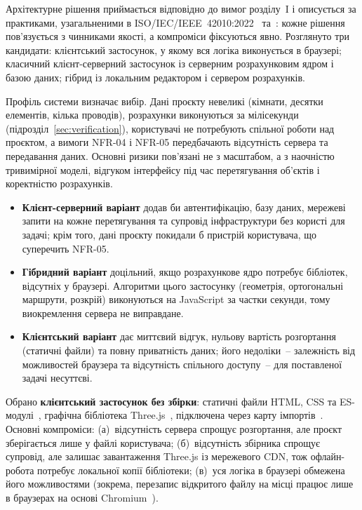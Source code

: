 

Архітектурне рішення приймається відповідно до вимог розділу~I і описується за практиками, узагальненими в ISO/IEC/IEEE~42010:2022~ та~: кожне рішення пов'язується з чинниками якості, а компроміси фіксуються явно. Розглянуто три кандидати: клієнтський застосунок, у якому вся логіка виконується в браузері; класичний клієнт-серверний застосунок із серверним розрахунковим ядром і базою даних; гібрид із локальним редактором і сервером розрахунків.

Профіль системи визначає вибір. Дані проєкту невеликі (кімнати, десятки елементів, кілька проводів), розрахунки виконуються за мілісекунди (підрозділ~\ref{sec:verification}), користувачі не потребують спільної роботи над проєктом, а вимоги NFR-04 і NFR-05 передбачають відсутність сервера та передавання даних. Основні ризики пов'язані не з масштабом, а з наочністю тривимірної моделі, відгуком інтерфейсу під час перетягування об'єктів і коректністю розрахунків.

\begin{itemize}[noitemsep, topsep=0.3em, leftmargin=*]
    \item \textbf{Клієнт-серверний варіант} додав би автентифікацію, базу даних, мережеві запити на кожне перетягування та супровід інфраструктури без користі для задачі; крім того, дані проєкту покидали б пристрій користувача, що суперечить NFR-05.
    \item \textbf{Гібридний варіант} доцільний, якщо розрахункове ядро потребує бібліотек, відсутніх у браузері. Алгоритми цього застосунку (геометрія, ортогональні маршрути, розкрій) виконуються на JavaScript за частки секунди, тому виокремлення сервера не виправдане.
    \item \textbf{Клієнтський варіант} дає миттєвий відгук, нульову вартість розгортання (статичні файли) та повну приватність даних; його недоліки~-- залежність від можливостей браузера та відсутність спільного доступу~-- для поставленої задачі несуттєві.
\end{itemize}

Обрано \textbf{клієнтський застосунок без збірки}: статичні файли HTML, CSS та ES-модулі~, графічна бібліотека Three.js~, підключена через карту імпортів~. Основні компроміси: (а)~відсутність сервера спрощує розгортання, але проєкт зберігається лише у файлі користувача; (б)~відсутність збірника спрощує супровід, але залишає завантаження Three.js із мережевого CDN, тож офлайн-робота потребує локальної копії бібліотеки; (в)~уся логіка в браузері обмежена його можливостями (зокрема, перезапис відкритого файлу на місці працює лише в браузерах на основі Chromium~).

